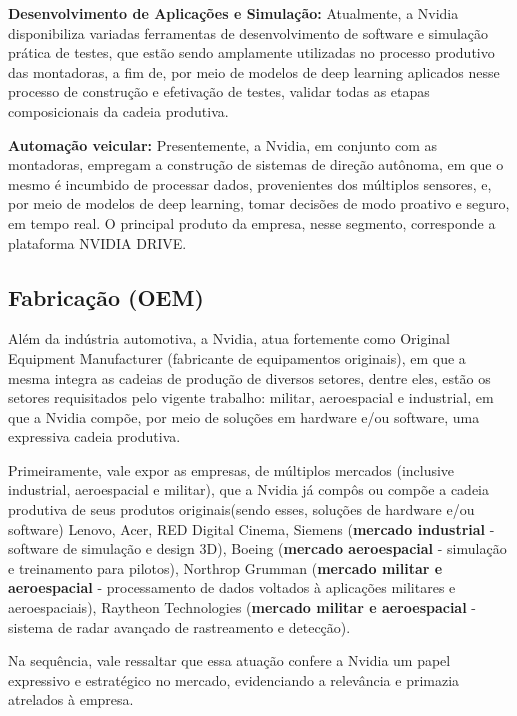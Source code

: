 \documentclass[conference]{IEEEtran}
\begin{document}
\par \textbf{Desenvolvimento de Aplicações e Simulação:} Atualmente, a Nvidia disponibiliza variadas ferramentas de desenvolvimento de software e simulação prática de testes, que estão sendo amplamente utilizadas no processo produtivo das montadoras, a fim de, por meio de modelos de deep learning aplicados nesse processo de construção e efetivação de testes, validar todas as etapas composicionais da cadeia produtiva. 

\par \textbf{Automação veicular: }Presentemente, a Nvidia, em conjunto com as montadoras, empregam a construção de sistemas de direção autônoma, em que o mesmo é incumbido de processar dados, provenientes dos múltiplos sensores, e, por meio de modelos de deep learning, tomar decisões de modo proativo e seguro, em tempo real. O principal produto da empresa, nesse segmento, corresponde a plataforma NVIDIA DRIVE.

\subsection{Fabricação (OEM)}
\par Além da indústria automotiva, a Nvidia, atua fortemente como Original Equipment Manufacturer (fabricante de equipamentos originais), em que a mesma integra as cadeias de produção de diversos setores, dentre eles, estão os setores requisitados pelo vigente trabalho: militar, aeroespacial e industrial, em que a Nvidia compõe, por meio de soluções em hardware e/ou software, uma expressiva cadeia produtiva.

\par Primeiramente, vale expor as empresas, de múltiplos mercados (inclusive industrial, aeroespacial e militar), que a Nvidia já compôs ou compõe a cadeia produtiva de seus produtos originais(sendo esses, soluções de hardware e/ou software) Lenovo, Acer, RED Digital Cinema, Siemens (\textbf{mercado industrial} - software de simulação e design 3D), Boeing (\textbf{mercado aeroespacial} - simulação e treinamento para pilotos), Northrop Grumman (\textbf{mercado militar e aeroespacial} - processamento de dados voltados à aplicações militares e aeroespaciais), Raytheon Technologies (\textbf{mercado militar e aeroespacial} - sistema de radar avançado de rastreamento e detecção).

\par Na sequência, vale ressaltar que essa atuação confere a Nvidia um papel expressivo e estratégico no mercado, evidenciando a relevância e primazia atrelados à empresa.
\end{document}
